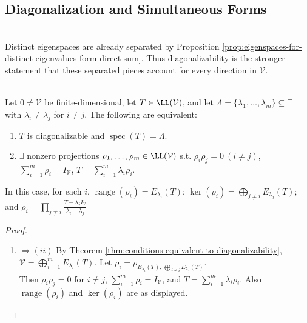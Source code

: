 \subsection{Diagonalization and Simultaneous Forms}

\begin{perspective} \label{per:diagonalizability-viewpoint} \\
Distinct eigenspaces are already separated by Proposition \ref{prop:eigenspaces-for-distinct-eigenvalues-form-direct-sum}. Thus diagonalizability is the stronger statement that these separated pieces account for every direction in $\mathcal{V}$.
\end{perspective}

\begin{theorem} \label{thm:algebraic-spectral-resolution-diagonalizable} \\
Let $0\neq\mathcal{V}$ be finite-dimensional, let $T\in\LL(\mathcal{V})$, and let $\Lambda=\{\lambda_1,\ldots,\lambda_m\}\subseteq\mathbb{F}$ with $\lambda_i\neq\lambda_j$ for $i\neq j$. The following are equivalent:
\begin{enumerate}[label=(\roman*).]
\setlength{\itemsep}{0pt}
\item $T$ is diagonalizable and $\operatorname{spec}(T)=\Lambda$.
\item $\exists$ nonzero projections $\rho_1,\ldots,\rho_m\in\LL(\mathcal{V})$ s.t. $\rho_i\rho_j=0\ (i\neq j)$, $\sum\limits_{i=1}^{m}\rho_i=I_{\mathcal{V}}$, $T=\sum\limits_{i=1}^{m}\lambda_i\rho_i$.
\end{enumerate}
In this case, for each $i$, $\operatorname{range}(\rho_i)=E_{\lambda_i}(T)$; $\ker(\rho_i)=\bigoplus_{j\neq i}E_{\lambda_j}(T)$; and $\rho_i=\prod\limits_{j\neq i}\frac{T-\lambda_jI_{\mathcal{V}}}{\lambda_i-\lambda_j}$
\begin{proof}
\begin{enumerate}[label=(\roman*).]
\setlength{\itemsep}{0pt}
\item[$(i)$]$\Rightarrow (ii)$ By Theorem \ref{thm:conditions-equivalent-to-diagonalizability}, $\mathcal{V}=\bigoplus\limits_{i=1}^{m}E_{\lambda_i}(T)$. Let $\rho_i=\rho_{E_{\lambda_i}(T),\,\bigoplus_{j\neq i}E_{\lambda_j}(T)}$.\\
Then $\rho_i\rho_j=0$ for $i\neq j$, $\sum\limits_{i=1}^{m}\rho_i=I_{\mathcal{V}}$, and $T=\sum\limits_{i=1}^{m}\lambda_i\rho_i$. Also $\operatorname{range}(\rho_i)$ and $\ker(\rho_i)$ are as displayed.\\

\end{enumerate}
\end{proof}
\end{theorem}
